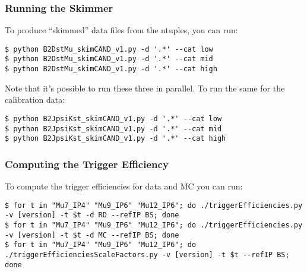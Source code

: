 \documentclass[12pt]{article}
\begin{document}
\subsubsection{Running the Skimmer}
To produce ``skimmed'' data files from the ntuples, you can run:
\begin{mdframed}[backgroundcolor=light-gray, roundcorner=10pt,leftmargin=1, rightmargin=1, innerleftmargin=15, innertopmargin=15,innerbottommargin=15, outerlinewidth=1, linecolor=light-gray,roundcorner=20pt]
\begin{lstlisting}
$ python B2DstMu_skimCAND_v1.py -d '.*' --cat low
$ python B2DstMu_skimCAND_v1.py -d '.*' --cat mid
$ python B2DstMu_skimCAND_v1.py -d '.*' --cat high
\end{lstlisting}
\end{mdframed}
Note that it's possible to run these three in parallel. To run the same for the calibration data:
\begin{mdframed}[backgroundcolor=light-gray, roundcorner=10pt,leftmargin=1, rightmargin=1, innerleftmargin=15, innertopmargin=15,innerbottommargin=15, outerlinewidth=1, linecolor=light-gray,roundcorner=20pt]
\begin{lstlisting}
$ python B2JpsiKst_skimCAND_v1.py -d '.*' --cat low
$ python B2JpsiKst_skimCAND_v1.py -d '.*' --cat mid
$ python B2JpsiKst_skimCAND_v1.py -d '.*' --cat high
\end{lstlisting}
\end{mdframed}
\subsubsection{Computing the Trigger Efficiency}
To compute the trigger efficiencies for data and MC you can run:
\begin{mdframed}[backgroundcolor=light-gray, roundcorner=10pt,leftmargin=1, rightmargin=1, innerleftmargin=15, innertopmargin=15,innerbottommargin=15, outerlinewidth=1, linecolor=light-gray,roundcorner=20pt]
\begin{lstlisting}
$ for t in "Mu7_IP4" "Mu9_IP6" "Mu12_IP6"; do ./triggerEfficiencies.py -v [version] -t $t -d RD --refIP BS; done
$ for t in "Mu7_IP4" "Mu9_IP6" "Mu12_IP6"; do ./triggerEfficiencies.py -v [version] -t $t -d MC --refIP BS; done
$ for t in "Mu7_IP4" "Mu9_IP6" "Mu12_IP6"; do ./triggerEfficienciesScaleFactors.py -v [version] -t $t --refIP BS; done
\end{lstlisting}
\end{mdframed}
\end{document}
